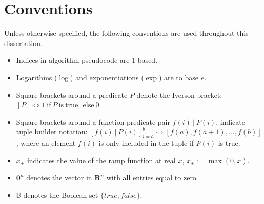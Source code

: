 \chapter*{Conventions}
Unless otherwise specified, the following conventions are used throughout this dissertation.

\begin{itemize}
  \item Indices in algorithm pseudocode are 1-based.
  \item Logarithms ($\log$) and exponentiations ($\exp$) are to base $e$.
  \item Square brackets around a predicate $P$ denote the Iverson bracket: $\left[P\right] \Leftrightarrow 1\ \mathrm{if}\ P \mathrm{~is~true,~else}\ 0$.
  \item Square brackets around a function-predicate pair $f(i)~|~P(i)$, indicate tuple builder notation: $\left[f(i)~|~P(i)\right]_{i=a}^b \Leftrightarrow \left[ f(a), f(a+1), \dots, f(b) \right]$, where an element $f(i)$ is only included in the tuple if $P(i)$ is true.
  \item $x_+$ indicates the value of the ramp function at real $x$, $x_+ := \max(0, x)$.
  \item $\mathbf{0}^n$ denotes the vector in $\mathbf{R}^n$ with all entries equal to zero.
  \item $\mathbb{B}$ denotes the Boolean set $\{true, false\}$.
\end{itemize}
